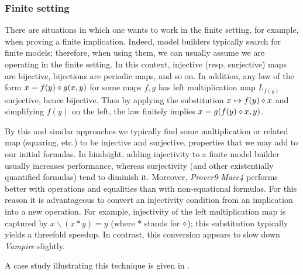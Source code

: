 \subsubsection{Finite setting}\label{finite setting}

There are situations in which one wants to work in the finite setting, for example, when proving a finite implication. Indeed, model builders typically search for finite models; therefore, when using them, we can usually assume we are operating in the finite setting. In this context, injective (resp. surjective) maps are bijective, bijections are periodic maps, and so on. In addition, any law of the form $x = f(y)\diamond g(x,y)$ for some maps $f,g$ has left multiplication map $L_{f(y)}$ surjective, hence bijective. Thus by applying the substitution $x\mapsto f(y)\diamond x$ and simplifying $f(y)$ on the left, the law finitely implies $x = g(f(y)\diamond x,y)$.

By this and similar approaches we typically find some multiplication or related map (squaring, etc.) to be injective and surjective, properties that we may add to our initial formulas. In hindsight, adding injectivity to a finite model builder usually increases performance, whereas surjectivity (and other existentially quantified formulas) tend to diminish it. Moreover, \emph{Prover9}-\emph{Mace4} performs better with operations and equalities than with non-equational formulas. For this reason it is advantageous to convert an injectivity condition from an implication into a new operation. For example, injectivity of the left multiplication map is captured by $x \backslash (x * y) = y$ (where $*$ stands for $\diamond$); this substitution typically yields a threefold speedup. In contrast, this conversion appears to slow down \emph{Vampire} slightly.

A case study illustrating this technique is given in .
